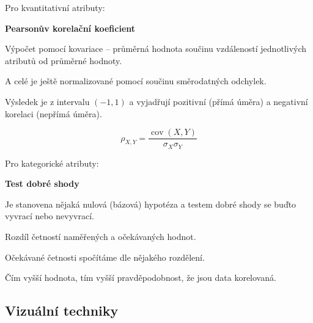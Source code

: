 \begin{compactitem}
    \item Pro kvantitativní atributy: \begin{compactitem}
        \item \textbf{Pearsonův korelační koeficient} \begin{compactitem}
            \item Výpočet pomocí kovariace -- průměrná hodnota součinu vzdáleností jednotlivých atributů od průměrné hodnoty.

            \item A celé je ještě normalizované pomocí součinu směrodatných odchylek.

            \item Výsledek je z intervalu $(-1, 1)$ a vyjadřují pozitivní (přímá úměra) a negativní korelaci (nepřímá úměra).
        \end{compactitem}
        \begin{equation}
            {\displaystyle \rho _{X,Y}={\frac {\operatorname {cov} (X,Y)}{\sigma _{X}\sigma _{Y}}}}
        \end{equation}
    \end{compactitem}

    \item Pro kategorické atributy: \begin{compactitem}
        \item \textbf{Test dobré shody} \begin{compactitem}
            \item Je stanovena nějaká nulová (bázová) hypotéza a testem dobré shody se buďto vyvrací nebo nevyvrací.

            \item Rozdíl četností naměřených a očekávaných hodnot.

            \item Očekávané četnosti spočítáme dle nějakého rozdělení.

            \item Čím vyšší hodnota, tím vyšší pravděpodobnost, že jsou data korelovaná.
        \end{compactitem}
    \end{compactitem}
\end{compactitem}





\subsection{Vizuální techniky}

